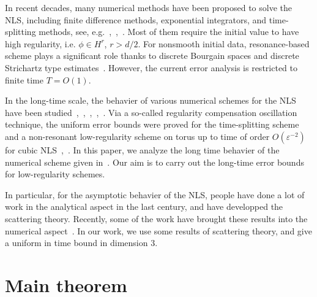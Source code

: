 \documentclass[10pt,a4paper]{article}
\begin{document}
  In recent decades, many numerical methods have been proposed to solve the NLS,
  including finite difference methods, exponential integrators, and time-splitting 
  methods, see, e.g.~\cite{BDD02},~\cite{Lub08},~\cite{Tha12}.
  Most of them require the initial value to have high regularity, i.e. \(\phi
  \in H^r\), \(r>d/2\). For nonsmooth initial data, resonance-based scheme plays
  a significant role thanks to discrete Bourgain spaces and discrete Strichartz
  type estimates~\cite{ORS21}. However, the current error analysis is restricted to
  finite time \(T=O(1)\). 

  In the long-time scale, the behavier of various
  numerical schemes for the NLS have been 
  studied~\cite{CCMM15},~\cite{FGP10},~\cite{FGP10b},~\cite{GL10},~\cite{GL10b}. 
  Via a so-called regularity compensation oscillation technique, the uniform
  error bounds were proved for the time-splitting scheme and a non-resonant
  low-regularity scheme on torus up to time of order \(O(\varepsilon^{-2})\) for cubic
  NLS~\cite{BCF},~\cite{FMS23}.
  In this paper, we analyze the long time behavier of the numerical scheme
  given in~\cite{ORS21}.
  Our aim is to carry out the long-time error bounds for low-regularity
  schemes. 

  In particular, for the asymptotic behavier of the NLS, people have
  done a lot of work in the analytical aspect in the last century, and
  have developped the scattering theory. Recently,
  some of the work have brought these results into the numerical aspect~\cite{CS22}. In our
  work, we use some results of scattering theory, and give a uniform in time
  bound in dimension \(3\).

  \section{Main theorem}
\end{document}
